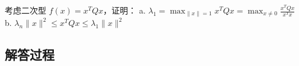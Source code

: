 \begin{example}[二次型极值]
    考虑二次型 \(f(x) = x^T Qx\)，证明：  
    a. \(\lambda_1 = \max_{\|x\|=1} x^T Qx = \max_{x \neq 0} \frac{x^T Qx}{x^T x}\)  
    b. \(\lambda_n \|x\|^2 \leq x^T Qx \leq \lambda_1 \|x\|^2\)
    \end{example}
    
    \subsection*{解答过程}
    